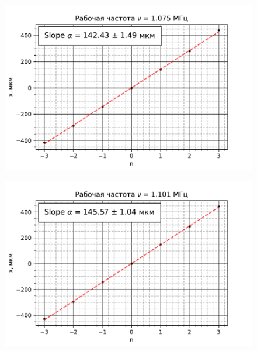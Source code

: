 	
	
	\begin{figure}
		\centering
		\includegraphics[scale=1]{./images/frequency2.ods.pdf}
		\label{fig:frequency2}
	\end{figure}
	
	
	
	\begin{figure}
		\centering
		\includegraphics[scale=1]{./images/frequency3.ods.pdf}
		\label{fig:frequency3}
	\end{figure}
	
	
	
